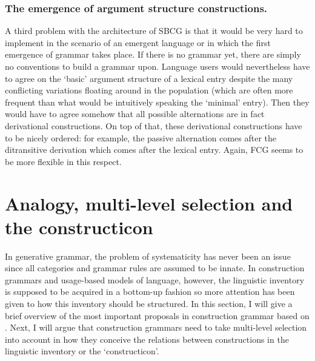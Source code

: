 \subsubsection{The emergence of argument structure constructions.}
A third problem with the architecture of SBCG is that it would be very hard to implement in the scenario of an emergent language or in which the first emergence of grammar takes place. If there is no grammar yet, there are simply no conventions to build a grammar upon. Language users would nevertheless have to agree on the `basic' argument structure of a lexical entry despite the many conflicting variations floating around in the population (which are often more frequent than what would be intuitively speaking the `minimal' entry). Then they would have to agree somehow that all possible alternations are in fact derivational constructions. On top of that, these derivational constructions have to be nicely ordered: for example, the passive alternation comes after the ditransitive derivation which comes after the lexical entry. Again, FCG seems to be more flexible in this respect.

\section{Analogy, multi-level selection and the constructicon}
\label{s:comp-constructicon}

In generative grammar, the problem of systematicity has never been an issue since all categories and grammar rules are assumed to be innate. In construction grammars and usage-based models of language, however, the linguistic inventory is supposed to be acquired in a bottom-up fashion so more attention has been given to how this inventory should be structured. In this section, I will give a brief overview of the most important proposals in construction grammar based on \citet[p. 262--290]{croft04cognitive}. Next, I will argue that construction grammars need to take multi-level selection into account in how they conceive the relations between constructions in the linguistic inventory or the `constructicon'.

